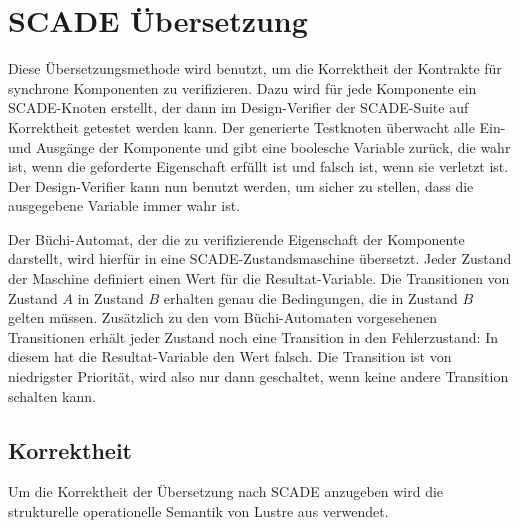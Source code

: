 \section{SCADE Übersetzung}
Diese Übersetzungsmethode wird benutzt, um die Korrektheit der Kontrakte für synchrone Komponenten zu verifizieren.
Dazu wird für jede Komponente ein SCADE-Knoten erstellt, der dann im Design-Verifier der SCADE-Suite auf Korrektheit getestet werden kann.
Der generierte Testknoten überwacht alle Ein- und Ausgänge der Komponente und gibt eine boolesche Variable zurück, die wahr ist, wenn die geforderte Eigenschaft erfüllt ist und falsch ist, wenn sie verletzt ist.
Der Design-Verifier kann nun benutzt werden, um sicher zu stellen, dass die ausgegebene Variable immer wahr ist.

Der Büchi-Automat, der die zu verifizierende Eigenschaft der Komponente darstellt, wird hierfür in eine SCADE-Zustandsmaschine übersetzt.
Jeder Zustand der Maschine definiert einen Wert für die Resultat-Variable.
Die Transitionen von Zustand $A$ in Zustand $B$ erhalten genau die Bedingungen, die in Zustand $B$ gelten müssen.
Zusätzlich zu den vom Büchi-Automaten vorgesehenen Transitionen erhält jeder Zustand noch eine Transition in den Fehlerzustand:
In diesem hat die Resultat-Variable den Wert falsch.
Die Transition ist von niedrigster Priorität, wird also nur dann geschaltet, wenn keine andere Transition schalten kann.
\subsection{Korrektheit}
Um die Korrektheit der Übersetzung nach SCADE anzugeben wird die strukturelle operationelle Semantik von Lustre aus \cite{functional_lustre} verwendet.